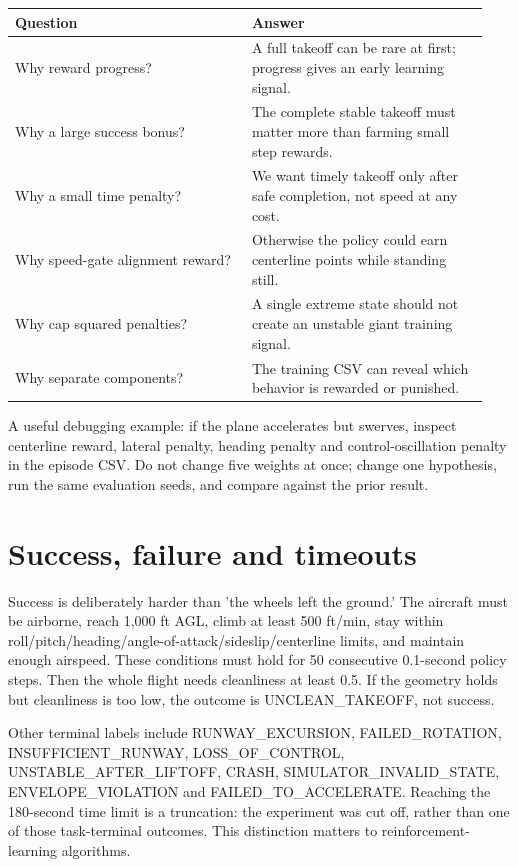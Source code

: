 \documentclass[11pt,a4paper]{article}
\begin{document}
\begin{longtable}{|p{0.47\linewidth}|p{0.47\linewidth}|}\hline
Question & Answer \\ \hline
Why reward progress? & A full takeoff can be rare at first; progress gives an early learning signal. \\ \hline
Why a large success bonus? & The complete stable takeoff must matter more than farming small step rewards. \\ \hline
Why a small time penalty? & We want timely takeoff only after safe completion, not speed at any cost. \\ \hline
Why speed-gate alignment reward? & Otherwise the policy could earn centerline points while standing still. \\ \hline
Why cap squared penalties? & A single extreme state should not create an unstable giant training signal. \\ \hline
Why separate components? & The training CSV can reveal which behavior is rewarded or punished. \\ \hline
\end{longtable}
A useful debugging example: if the plane accelerates but swerves, inspect centerline reward, lateral penalty, heading penalty and control-oscillation penalty in the episode CSV. Do not change five weights at once; change one hypothesis, run the same evaluation seeds, and compare against the prior result.

\section{Success, failure and timeouts}
Success is deliberately harder than 'the wheels left the ground.' The aircraft must be airborne, reach 1,000 ft AGL, climb at least 500 ft/min, stay within roll/pitch/heading/angle-of-attack/sideslip/centerline limits, and maintain enough airspeed. These conditions must hold for 50 consecutive 0.1-second policy steps. Then the whole flight needs cleanliness at least 0.5. If the geometry holds but cleanliness is too low, the outcome is UNCLEAN\_TAKEOFF, not success.

Other terminal labels include RUNWAY\_EXCURSION, FAILED\_ROTATION, INSUFFICIENT\_RUNWAY, LOSS\_OF\_CONTROL, UNSTABLE\_AFTER\_LIFTOFF, CRASH, SIMULATOR\_INVALID\_STATE, ENVELOPE\_VIOLATION and FAILED\_TO\_ACCELERATE. Reaching the 180-second time limit is a truncation: the experiment was cut off, rather than one of those task-terminal outcomes. This distinction matters to reinforcement-learning algorithms.
\end{document}
